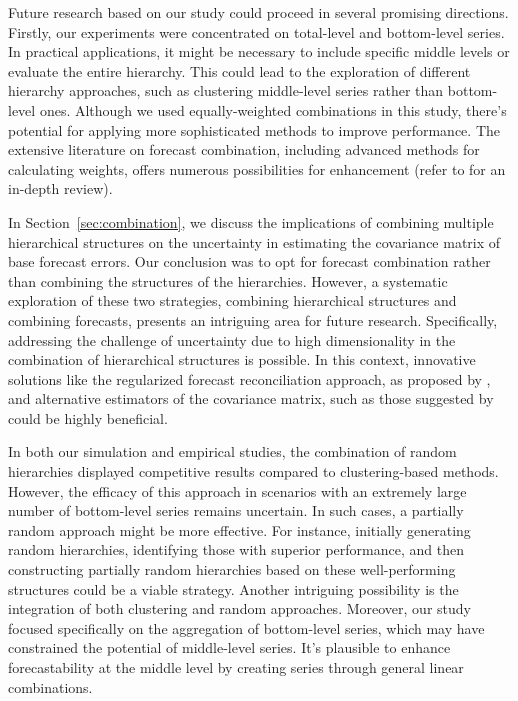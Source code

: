 \documentclass[a4paper,review,12pt,authoryear]{elsarticle}
\begin{document}
Future research based on our study could proceed in several promising directions. Firstly, our experiments were concentrated on total-level and bottom-level series. In practical applications, it might be necessary to include specific middle levels or evaluate the entire hierarchy. This could lead to the exploration of different hierarchy approaches, such as clustering middle-level series rather than bottom-level ones. Although we used equally-weighted combinations in this study, there's potential for applying more sophisticated methods to improve performance. The extensive literature on forecast combination, including advanced methods for calculating weights, offers numerous possibilities for enhancement (refer to \citealp{wangForecastCombinations50year2022} for an in-depth review).

In Section~\ref{sec:combination}, we discuss the implications of combining multiple hierarchical structures on the uncertainty in estimating the covariance matrix of base forecast errors. Our conclusion was to opt for forecast combination rather than combining the structures of the hierarchies.  However, a systematic exploration of these two strategies, combining hierarchical structures and combining forecasts, presents an intriguing area for future research. Specifically, addressing the challenge of uncertainty due to high dimensionality in the combination of hierarchical structures is possible. In this context, innovative solutions like the regularized forecast reconciliation approach, as proposed by \cite{bentaiebRegularizedRegressionHierarchical2019a}, and alternative estimators of the covariance matrix, such as those suggested by \cite{pritulargaStochasticCoherencyForecast2021} could be highly beneficial. 

In both our simulation and empirical studies, the combination of random hierarchies displayed competitive results compared to clustering-based methods. However, the efficacy of this approach in scenarios with an extremely large number of bottom-level series remains uncertain. In such cases, a partially random approach might be more effective. For instance, initially generating random hierarchies, identifying those with superior performance, and then constructing partially random hierarchies based on these well-performing structures could be a viable strategy. Another intriguing possibility is the integration of both clustering and random approaches. Moreover, our study focused specifically on the aggregation of bottom-level series, which may have constrained the potential of middle-level series. It's plausible to enhance forecastability at the middle level by creating series through general linear combinations. 
\end{document}
